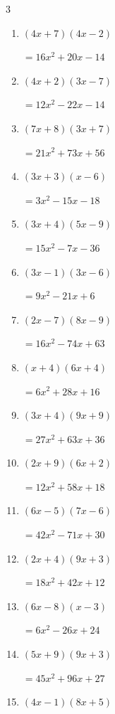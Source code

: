 \begin{multicols}{3}
\begin{enumerate}
        $=6x^{2}-54$

\columnbreak %

  \item $(4x+7)(4x-2)$

        $=16x^{2}+20x-14$

  \item $(4x+2)(3x-7)$

        $=12x^{2}-22x-14$

  \item $(7x+8)(3x+7)$

        $=21x^{2}+73x+56$

  \item $(3x+3)(x-6)$

        $=3x^{2}-15x-18$

  \item $(3x+4)(5x-9)$

        $=15x^{2}-7x-36$

  \item $(3x-1)(3x-6)$

        $=9x^{2}-21x+6$

  \item $(2x-7)(8x-9)$

        $=16x^{2}-74x+63$

  \item $(x+4)(6x+4)$

        $=6x^{2}+28x+16$

  \item $(3x+4)(9x+9)$

        $=27x^{2}+63x+36$

  \item $(2x+9)(6x+2)$

        $=12x^{2}+58x+18$

  \item $(6x-5)(7x-6)$

        $=42x^{2}-71x+30$

  \item $(2x+4)(9x+3)$

        $=18x^{2}+42x+12$

  \item $(6x-8)(x-3)$

        $=6x^{2}-26x+24$

  \item $(5x+9)(9x+3)$

        $=45x^{2}+96x+27$

  \item $(4x-1)(8x+5)$


\end{enumerate}
\end{multicols}
